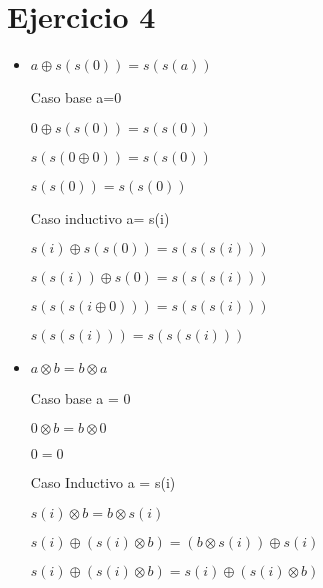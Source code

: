 \documentclass{article}
\begin{document}
\section{Ejercicio 4}
\begin{itemize}

        \item{$a\oplus s(s(0))=s(s(a))$} 
        \begin{flushleft}
        Caso base a=0 \\
        \end{flushleft}
        \begin{flushleft}
        $0 \oplus s(s(0)) = s(s(0))$ 
        \end{flushleft}
        \begin{flushleft}
        $s(s(0 \oplus 0)) =s(s(0))$ 
        \end{flushleft}
        \begin{flushleft}
        $s(s(0)) = s(s(0))$ 
        \end{flushleft}
        \begin{flushleft}
        Caso inductivo a= s(i) 
        \end{flushleft}
        \begin{flushleft}
        $s(i) \oplus s(s(0)) = s(s(s(i))) $ 
        \end{flushleft}
        \begin{flushleft}
        $s(s(i)) \oplus s(0) = s(s(s(i)))$ 
        \end{flushleft}
        \begin{flushleft}
        $s(s(s(i\oplus 0))) = s(s(s(i)))$ 
        \end{flushleft}
        \begin{flushleft}
        $s(s(s(i))) = s(s(s(i)))$
        \end{flushleft}
        \item{$a \otimes b = b \otimes a$}
        \begin{flushleft}
        Caso base a = 0 
        \end{flushleft}
        \begin{flushleft}
        $0 \otimes b = b \otimes 0$ 
        \end{flushleft}
        \begin{flushleft}
        $0 = 0$ 
        \end{flushleft}
        \begin{flushleft}
        Caso Inductivo a = s(i)
        \end{flushleft}
        \begin{flushleft}
            $s(i) \otimes b = b \otimes s(i)$ 
        \end{flushleft}
        \begin{flushleft}
            $s(i) \oplus (s(i)\otimes b) = (b \otimes s(i)) \oplus s(i)$
        \end{flushleft}
        \begin{flushleft}
            $s(i) \oplus (s(i)\otimes b) = s(i) \oplus (s(i) \otimes b)$
        \end{flushleft}


\end{itemize}
\end{document}
